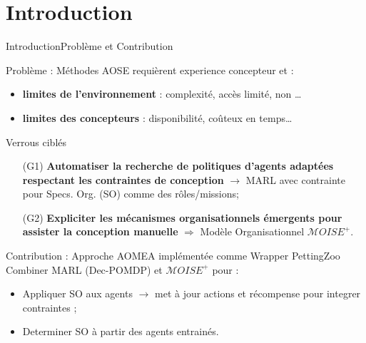 

\addtocounter{framenumber}{-1}

\section{Introduction}

\begin{frame}{Introduction}{Problème et Contribution}


    \begin{alertblock}{Problème : Méthodes AOSE requièrent experience concepteur et  :}
        \begin{itemize}
            \item \textbf{limites de l'environnement} : complexité, accès limité, non \dots
            \item \textbf{limites des concepteurs} : disponibilité, coûteux en temps\dots
        \end{itemize}
    \end{alertblock}

    \begin{block}{Verrous ciblés}
        \begin{enumerate}
            \item[\phantom{X} (G1)] \textbf{Automatiser la recherche de politiques d'agents adaptées respectant les contraintes de conception} $\rightarrow$ MARL avec contrainte pour Specs. Org. (SO) comme des rôles/missions;
            \item[\phantom{X} (G2)] \textbf{Expliciter les mécanismes organisationnels émergents pour assister la conception manuelle} $\Longrightarrow$ Modèle Organisationnel $\mathcal{M}OISE^+$.
        \end{enumerate}
    \end{block}

    \begin{exampleblock}{Contribution : Approche AOMEA implémentée comme Wrapper PettingZoo~\cite{soule2024}}
        Combiner MARL (Dec-POMDP) et $\mathcal{M}OISE^+$ pour :
        \begin{itemize}
            \item Appliquer SO aux agents $\rightarrow$ met à jour actions et récompense pour integrer contraintes ;
            \item Determiner SO  à partir des agents entrainés.
        \end{itemize}
    \end{exampleblock}

\end{frame}
